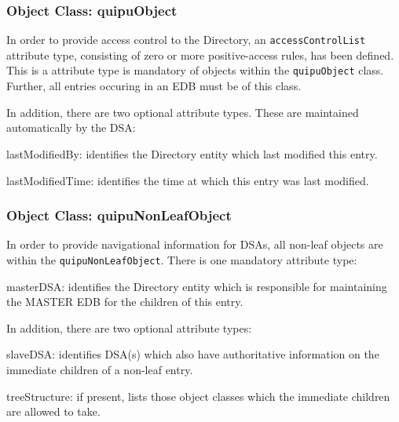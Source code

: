\subsubsection	{Object Class: quipuObject}
In order to provide access control to the Directory,
an \verb"accessControlList" attribute type,
consisting of zero or more positive-access rules,
has been defined.
This is a attribute type is mandatory of objects within the \verb"quipuObject"
class.
Further,
all entries occuring in an EDB must be of this class.

In addition,
there are two optional attribute types.
These are maintained automatically by the DSA:
\begin{describe}
\item[lastModifiedBy:]
			identifies the Directory entity which last modified
			this entry.

\item[lastModifiedTime:]
			identifies the time at which this entry was last
			modified.
\end{describe}

\subsubsection	{Object Class: quipuNonLeafObject}
In order to provide navigational information for DSAs,
all non-leaf objects are within the \verb"quipuNonLeafObject".
There is one mandatory attribute type:
\begin{describe}
\item[masterDSA:]
			identifies the Directory entity which is responsible
			for maintaining the MASTER EDB for the children of
			this entry.
\end{describe}
In addition,
there are two optional attribute types:
\begin{describe}
\item[slaveDSA:]
			identifies DSA(s) which also have authoritative
			information on the immediate children of a non-leaf
			entry.

\item[treeStructure:]
			if present, lists those object classes which the
			immediate children are allowed to take.
\end{describe}

